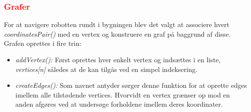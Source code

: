 \subsubsection{ \textcolor{red}{Grafer}}
For at navigere robotten rundt i bygningen blev det valgt at associere hvert \emph{coordinatesPair()} med en vertex og konstruere en graf på baggrund af disse. Grafen oprettes i fire trin:
\begin{itemize}
	\item \emph{addVertex():} Først oprettes hver enkelt vertex og indsættes i en liste, \emph{vertices[n]} således at de kan tilgås ved en simpel indeksering.
	\item \emph{createEdges():} Som navnet antyder sørger denne funktion for at oprette edges imellem alle tilstødende vertices. Hvorvidt en vertex grænser op mod en anden afgøres ved at undersøge forholdene imellem deres koordinater. 

\begin{figure}[h!]
	

\end{figure}
\end{itemize}
